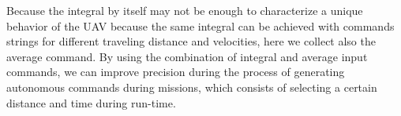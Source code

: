 \documentclass[letterpaper, 10 pt, conference]{ieeeconf}  %
\newcommand\NB[1]{$\spadesuit$\footnote{NB: #1}}
\begin{document}
Because the integral by itself may not be enough to characterize a unique behavior of the UAV because the same integral can be achieved with commands strings for different traveling distance and velocities, here we collect also the average command. By using the combination of integral and average input commands, we can improve precision during the process of generating autonomous commands during missions, which consists of selecting a certain distance and time during run-time.

%

\end{document}
